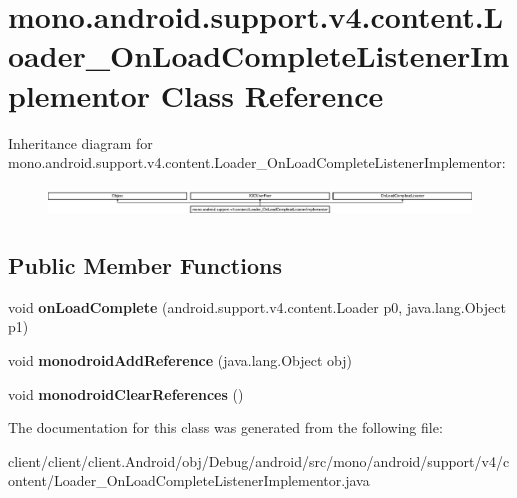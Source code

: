 \hypertarget{classmono_1_1android_1_1support_1_1v4_1_1content_1_1Loader__OnLoadCompleteListenerImplementor}{}\section{mono.\+android.\+support.\+v4.\+content.\+Loader\+\_\+\+On\+Load\+Complete\+Listener\+Implementor Class Reference}
\label{classmono_1_1android_1_1support_1_1v4_1_1content_1_1Loader__OnLoadCompleteListenerImplementor}
Inheritance diagram for mono.\+android.\+support.\+v4.\+content.\+Loader\+\_\+\+On\+Load\+Complete\+Listener\+Implementor\+:\begin{figure}[H]
\begin{center}
\leavevmode
\includegraphics[height=0.801144cm]{classmono_1_1android_1_1support_1_1v4_1_1content_1_1Loader__OnLoadCompleteListenerImplementor}
\end{center}
\end{figure}
\subsection*{Public Member Functions}
\begin{DoxyCompactItemize}
\item 
\hypertarget{classmono_1_1android_1_1support_1_1v4_1_1content_1_1Loader__OnLoadCompleteListenerImplementor_a9b4a8a9e279f40edd649d27a3078c7e0}{}void {\bfseries on\+Load\+Complete} (android.\+support.\+v4.\+content.\+Loader p0, java.\+lang.\+Object p1)\label{classmono_1_1android_1_1support_1_1v4_1_1content_1_1Loader__OnLoadCompleteListenerImplementor_a9b4a8a9e279f40edd649d27a3078c7e0}

\item 
\hypertarget{classmono_1_1android_1_1support_1_1v4_1_1content_1_1Loader__OnLoadCompleteListenerImplementor_a3a4c9ef8ad15330e6de3d2665a8cc66e}{}void {\bfseries monodroid\+Add\+Reference} (java.\+lang.\+Object obj)\label{classmono_1_1android_1_1support_1_1v4_1_1content_1_1Loader__OnLoadCompleteListenerImplementor_a3a4c9ef8ad15330e6de3d2665a8cc66e}

\item 
\hypertarget{classmono_1_1android_1_1support_1_1v4_1_1content_1_1Loader__OnLoadCompleteListenerImplementor_ada446ac79bc14bf9ee76ba6859226059}{}void {\bfseries monodroid\+Clear\+References} ()\label{classmono_1_1android_1_1support_1_1v4_1_1content_1_1Loader__OnLoadCompleteListenerImplementor_ada446ac79bc14bf9ee76ba6859226059}

\end{DoxyCompactItemize}


The documentation for this class was generated from the following file\+:\begin{DoxyCompactItemize}
\item 
client/client/client.\+Android/obj/\+Debug/android/src/mono/android/support/v4/content/Loader\+\_\+\+On\+Load\+Complete\+Listener\+Implementor.\+java\end{DoxyCompactItemize}
